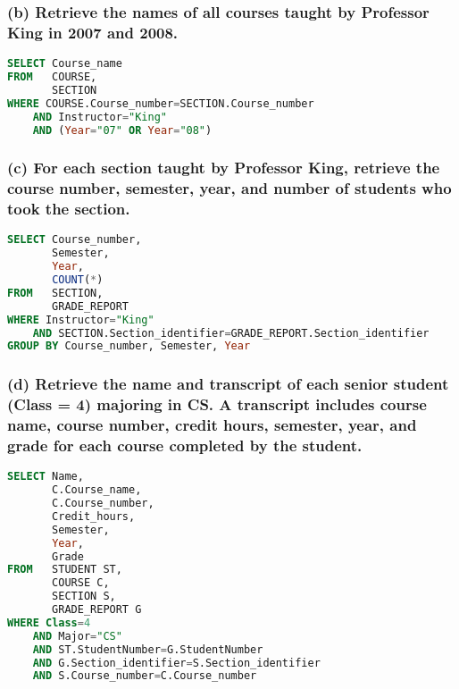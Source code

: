 \subsubsection*{(b) Retrieve the names of all courses taught by Professor King in 2007 and 2008.}
\begin{lstlisting}[language=SQL]
SELECT Course_name
FROM   COURSE,
       SECTION
WHERE COURSE.Course_number=SECTION.Course_number
    AND Instructor="King"
    AND (Year="07" OR Year="08")
\end{lstlisting}

\subsubsection*{(c) For each section taught by Professor King, retrieve the course number, semester, year, and number of students who took the section.}
\begin{lstlisting}[language=SQL]
SELECT Course_number,
       Semester,
       Year,
       COUNT(*)
FROM   SECTION,
       GRADE_REPORT
WHERE Instructor="King"
    AND SECTION.Section_identifier=GRADE_REPORT.Section_identifier
GROUP BY Course_number, Semester, Year
\end{lstlisting}

\subsubsection*{(d) Retrieve the name and transcript of each senior student (Class = 4) majoring in CS. A transcript includes course name, course number, credit hours, semester, year, and grade for each course completed by the student.}
\begin{lstlisting}[language=SQL]
SELECT Name,
       C.Course_name,
       C.Course_number,
       Credit_hours,
       Semester,
       Year,
       Grade
FROM   STUDENT ST,
       COURSE C,
       SECTION S,
       GRADE_REPORT G
WHERE Class=4 
    AND Major="CS"
    AND ST.StudentNumber=G.StudentNumber
    AND G.Section_identifier=S.Section_identifier
    AND S.Course_number=C.Course_number
\end{lstlisting}